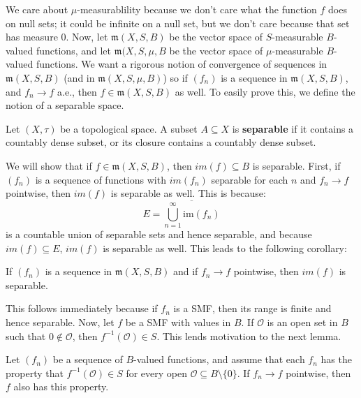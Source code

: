 	We care about $\mu$-measurablility because we don't care what the function $f$ does on null sets; it could be infinite 
	on a null set, but we don't care because that set has measure $0$. Now, let $\mathfrak m(X, S, B)$ be the vector space 
	of $S$-measurable $B$-valued functions, and let $\mathfrak m(X, S, \mu, B$ be the vector space of $\mu$-measurable 
	$B$-valued functions. We want a rigorous notion of convergence of sequences in $\mathfrak m(X, S, B)$ (and in 
	$\mathfrak m(X, S, \mu, B)$) so if $(f_n)$ is a sequence in $\mathfrak m(X, S, B)$, and $f_n\rightarrow f$ a.e., then 
	$f\in \mathfrak m(X, S, B)$ as well. To easily prove this, we define the notion of a separable space.
	
	\begin{definition}
		Let $(X, \tau)$ be a topological space. A subset $A\subseteq X$ is \textbf{separable} if it contains a countably dense 
		subset, or its closure contains a countably dense subset.
	\end{definition}
	
	We will show that if $f\in\mathfrak m(X, S, B)$, then $im(f)\subseteq B$ is separable. First, if $(f_n)$ is a sequence of 
	functions with $im(f_n)$ separable for each $n$ and $f_n\rightarrow f$ pointwise, then $im(f)$ is separable as well. 
	This is because:
	$$
		E = \overline{\bigcup_{n = 1}^\infty \mathrm{im}(f_n)}
	$$
	is a countable union of separable sets and hence separable, and because $im(f)\subseteq E$, $im(f)$ is separable as 
	well. This leads to the following corollary:
	
	\begin{corollary}
		If $(f_n)$ is a sequence in $\mathfrak m(X, S, B)$ and if $f_n\rightarrow f$ pointwise, then $im(f)$ is separable.
	\end{corollary}
	
	This follows immediately because if $f_n$ is a SMF, then its range is finite and hence separable. Now, let
	$f$ be a SMF with values in $B$. If $\mathcal O$ is an open set in $B$ such that $0\notin\mathcal O$, then 
	$f^{-1}(\mathcal O)\in S$. This lends motivation to the next lemma.
	
	\begin{lemma}
		Let $(f_n)$ be a sequence of $B$-valued functions, and assume that each $f_n$ has the property that 
		$f^{-1}(\mathcal O)\in S$ for every open $\mathcal O\subseteq B\setminus\{0\}$. If $f_n\rightarrow f$ pointwise, 
		then $f$ also has this property. 
	\end{lemma}
	
